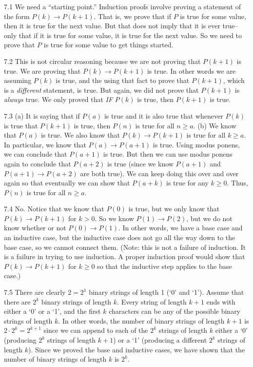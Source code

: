 \begin{RequAnswer}{7.1}
We need a ``starting point.'' Induction proofs involve proving
a statement of the form $P(k)\rightarrow P(k+1)$. That is, we prove that if $P$ is
true for some value, then it is true for the next value.
But that does not imply that it is ever true--only that if it is true for some value,
it is true for the next value.
So we need to prove that $P$ is true for some value to get things started.
\end{RequAnswer}
\begin{RequAnswer}{7.2}
This is not circular reasoning because we are not proving that $P(k+1)$ is true.
We are proving that $P(k)\rightarrow P(k+1)$ is true.
In other words we are assuming $P(k)$ is true, and the using that fact to prove that $P(k+1)$,
which is a {\em different} statement, is true.
But again, we did not prove that $P(k+1)$
is {\em always} true. We only proved that {\em IF} $P(k)$ is true, then $P(k+1)$ is true.
\end{RequAnswer}
\begin{RequAnswer}{7.3}
(a) It is saying that if $P(a)$ is true and it is also true that whenever $P(k)$ is true that $P(k+1)$ is true,
then $P(n)$ is true for all $n\geq a$.
(b) We know that $P(a)$ is true.
We also know that $P(k)\rightarrow P(k+1)$ is true for all $k\geq a$.
In particular, we know that $P(a)\rightarrow P(a+1)$ is true.
Using modus ponens, we can conclude that $P(a+1)$ is true.
But then we can use modus ponens again to conclude that $P(a+2)$ is true
(since we know $P(a+1)$ and $P(a+1)\rightarrow P(a+2)$ are both true).
We can keep doing this over and over again so that eventually we can
show that $P(a+k)$ is true for any $k\geq 0$. Thus, $P(n)$ is true for all $n\geq a$.
\end{RequAnswer}
\begin{RequAnswer}{7.4}
No. Notice that we know that $P(0)$ is true, but we only know that $P(k)\rightarrow P(k+1)$ for $k>0$.
So we know $P(1)\rightarrow P(2)$, but we do not know whether or not $P(0)\rightarrow P(1)$.
In other words, we have a base case and an inductive case, but the inductive case does not go all the
way down to the base case, so we cannot connect them.
(Note: this is not a failure of induction. It is a failure in trying to use induction. A proper induction proof
would show that $P(k)\rightarrow P(k+1)$ for $k\geq 0$ so that the inductive step applies to the base case.)
\end{RequAnswer}
\begin{RequAnswer}{7.5}
There are clearly $2=2^1$ binary strings of length 1 (`0' and `1').
Assume that there are $2^k$ binary strings of length $k$.
Every string of length $k+1$ ends with either a `0' or a `1', and the first $k$ characters can
be any of the possible binary strings of length $k$. In other words, the number of binary strings of length
$k+1$ is $2\cdot 2^k=2^{k+1}$ since we can append to each of the $2^k$ strings of length $k$ either a `0' (producing
$2^k$ strings of length $k+1$) or a `1' (producing a different $2^k$ strings of length $k$).
Since we proved the base and inductive cases, we have shown that the number of binary strings of length $k$ is $2^k$.
\end{RequAnswer}
